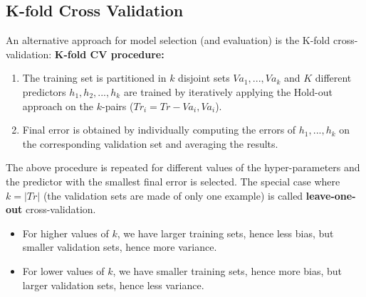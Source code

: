 \subsection{K-fold Cross Validation}
An alternative approach for model selection (and evaluation) is the K-fold cross-validation:\newline\newline
\textbf{K-fold CV procedure:}\newline
\begin{enumerate}
    \item The training set is partitioned in $k$ disjoint sets $Va_{1}, ..., Va_{k}$ and $K$ different predictors $h_{1}, h_{2}, ..., h_{k}$ are trained by iteratively applying the Hold-out approach on the $k$-pairs ($Tr_{i} = Tr - Va_{i}, Va_{i}$).

    \item Final error is obtained by individually computing the errors of $h_{1},...,h_{k}$ on the corresponding validation set and averaging the results.
\end{enumerate}
The above procedure is repeated for different values of the hyper-parameters and the predictor with the smallest final error is selected.\newline\newline
The special case where $k = |Tr|$ (the validation sets are made of only one example) is called \textbf{leave-one-out} cross-validation.
\begin{itemize}
    \item For higher values of $k$, we have larger training sets, hence less bias, but smaller validation sets, hence more variance.

    \item For lower values of $k$, we have smaller training sets, hence more bias, but larger validation sets, hence less variance.
\end{itemize}

